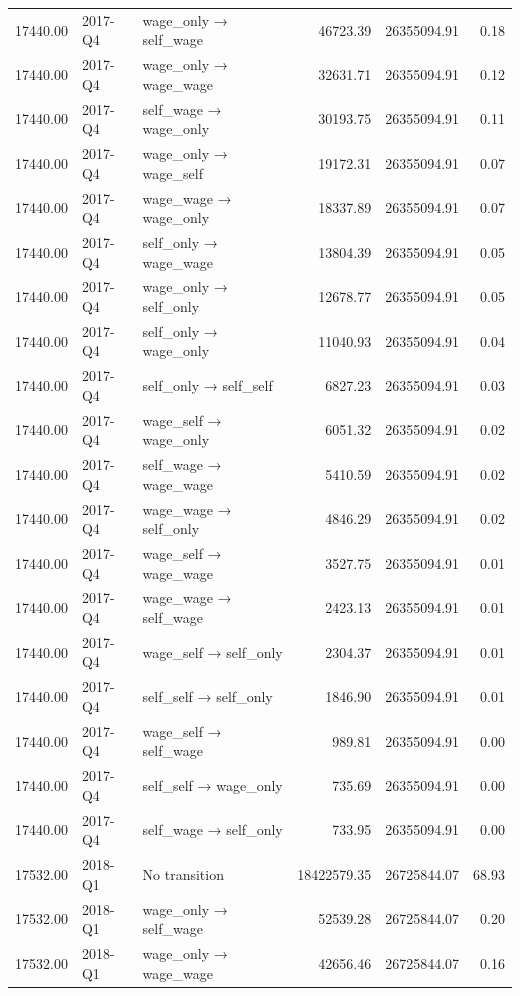\begin{table}[ht]
{\begin{tabular}{rllrrr}
  17440.00 & 2017-Q4 & wage\_only → self\_wage & 46723.39 & 26355094.91 & 0.18 \\ 
  17440.00 & 2017-Q4 & wage\_only → wage\_wage & 32631.71 & 26355094.91 & 0.12 \\ 
  17440.00 & 2017-Q4 & self\_wage → wage\_only & 30193.75 & 26355094.91 & 0.11 \\ 
  17440.00 & 2017-Q4 & wage\_only → wage\_self & 19172.31 & 26355094.91 & 0.07 \\ 
  17440.00 & 2017-Q4 & wage\_wage → wage\_only & 18337.89 & 26355094.91 & 0.07 \\ 
  17440.00 & 2017-Q4 & self\_only → wage\_wage & 13804.39 & 26355094.91 & 0.05 \\ 
  17440.00 & 2017-Q4 & wage\_only → self\_only & 12678.77 & 26355094.91 & 0.05 \\ 
  17440.00 & 2017-Q4 & self\_only → wage\_only & 11040.93 & 26355094.91 & 0.04 \\ 
  17440.00 & 2017-Q4 & self\_only → self\_self & 6827.23 & 26355094.91 & 0.03 \\ 
  17440.00 & 2017-Q4 & wage\_self → wage\_only & 6051.32 & 26355094.91 & 0.02 \\ 
  17440.00 & 2017-Q4 & self\_wage → wage\_wage & 5410.59 & 26355094.91 & 0.02 \\ 
  17440.00 & 2017-Q4 & wage\_wage → self\_only & 4846.29 & 26355094.91 & 0.02 \\ 
  17440.00 & 2017-Q4 & wage\_self → wage\_wage & 3527.75 & 26355094.91 & 0.01 \\ 
  17440.00 & 2017-Q4 & wage\_wage → self\_wage & 2423.13 & 26355094.91 & 0.01 \\ 
  17440.00 & 2017-Q4 & wage\_self → self\_only & 2304.37 & 26355094.91 & 0.01 \\ 
  17440.00 & 2017-Q4 & self\_self → self\_only & 1846.90 & 26355094.91 & 0.01 \\ 
  17440.00 & 2017-Q4 & wage\_self → self\_wage & 989.81 & 26355094.91 & 0.00 \\ 
  17440.00 & 2017-Q4 & self\_self → wage\_only & 735.69 & 26355094.91 & 0.00 \\ 
  17440.00 & 2017-Q4 & self\_wage → self\_only & 733.95 & 26355094.91 & 0.00 \\ 
  17532.00 & 2018-Q1 & No transition & 18422579.35 & 26725844.07 & 68.93 \\ 
  17532.00 & 2018-Q1 & wage\_only → self\_wage & 52539.28 & 26725844.07 & 0.20 \\ 
  17532.00 & 2018-Q1 & wage\_only → wage\_wage & 42656.46 & 26725844.07 & 0.16 \\ 

\end{tabular}}
\end{table}
